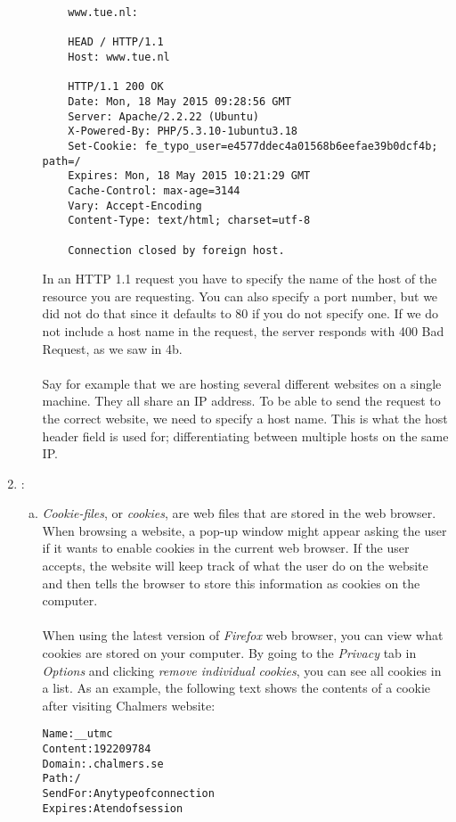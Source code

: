 \documentclass[a4paper,9pt,fleqn]{article}
\begin{document}
\begin{enumerate}[{Task} 1]
\begin{enumerate}[a)]
\begin{lstlisting}
	www.tue.nl:

	HEAD / HTTP/1.1
	Host: www.tue.nl

	HTTP/1.1 200 OK
	Date: Mon, 18 May 2015 09:28:56 GMT
	Server: Apache/2.2.22 (Ubuntu)
	X-Powered-By: PHP/5.3.10-1ubuntu3.18
	Set-Cookie: fe_typo_user=e4577ddec4a01568b6eefae39b0dcf4b; path=/
	Expires: Mon, 18 May 2015 10:21:29 GMT
	Cache-Control: max-age=3144
	Vary: Accept-Encoding
	Content-Type: text/html; charset=utf-8

	Connection closed by foreign host.
\end{lstlisting}

In an HTTP 1.1 request you have to specify the name of the host of the resource
you are requesting. You can also specify a port number, but we did not do that
since it defaults to 80 if you do not specify one. If we do not include a host
name in the request, the server responds with 400 Bad Request, as we saw in 4b.
\\
\\
Say for example that we are hosting several different websites on a single machine.
They all share an IP address. To be able to send the request to the correct
website, we need to specify a host name. This is what the host header field is used
for; differentiating between multiple hosts on the same IP.

\end{enumerate}

\item :
\begin{enumerate}[a)]
\item 
{\it Cookie-files}, or {\it cookies}, are web files that are stored in the web browser.
When browsing a website, a pop-up window might appear asking the user if it wants to
enable cookies in the current web browser. If the user accepts, the website will keep
track of what the user do on the website and then tells the browser to store this
information as cookies on the computer.
\\
\\
When using the latest version of {\it Firefox} web browser, you can view what cookies
are stored on your computer. By going to the {\it Privacy} tab in {\it Options} and
clicking {\it remove individual cookies}, you can see all cookies in a list. As an example,
the following text shows the contents of a cookie after visiting Chalmers website:

\newpage

\begin{alltt}
\outp
\small
         Name:	__utmc
      Content:	192209784
       Domain:	.chalmers.se
         Path:	/
     Send For:	Any type of connection
      Expires:	At end of session
\end{alltt}


\end{enumerate}
\end{enumerate}
\end{document}
